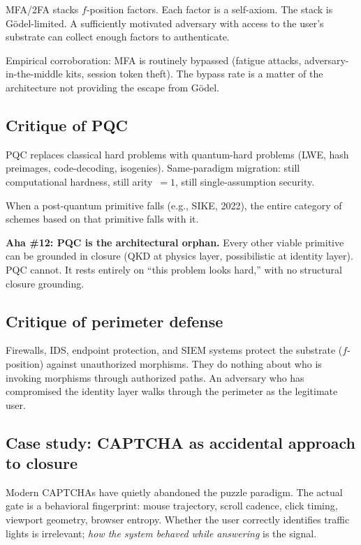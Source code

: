 \documentclass[11pt,a4paper]{article}
\theoremstyle{definition}
\theoremstyle{remark}
\newcommand{\aha}[2]{\medskip\textbf{Aha \##1: #2}}
\begin{document}
MFA/2FA stacks $f$-position factors. Each factor is a self-axiom. The stack is G\"odel-limited. A sufficiently motivated adversary with access to the user's substrate can collect enough factors to authenticate.

Empirical corroboration: MFA is routinely bypassed (fatigue attacks, adversary-in-the-middle kits, session token theft). The bypass rate is a matter of the architecture not providing the escape from G\"odel.

\subsection{Critique of PQC}

PQC replaces classical hard problems with quantum-hard problems (LWE, hash preimages, code-decoding, isogenies). Same-paradigm migration: still computational hardness, still arity~$= 1$, still single-assumption security.

When a post-quantum primitive falls (e.g., SIKE, 2022), the entire category of schemes based on that primitive falls with it.

\aha{12}{PQC is the architectural orphan.} Every other viable primitive can be grounded in closure (QKD at physics layer, possibilistic at identity layer). PQC cannot. It rests entirely on ``this problem looks hard,'' with no structural closure grounding.

\subsection{Critique of perimeter defense}

Firewalls, IDS, endpoint protection, and SIEM systems protect the substrate ($f$-position) against unauthorized morphisms. They do nothing about who is invoking morphisms through authorized paths. An adversary who has compromised the identity layer walks through the perimeter as the legitimate user.

\subsection{Case study: CAPTCHA as accidental approach to closure}

Modern CAPTCHAs have quietly abandoned the puzzle paradigm. The actual gate is a behavioral fingerprint: mouse trajectory, scroll cadence, click timing, viewport geometry, browser entropy. Whether the user correctly identifies traffic lights is irrelevant; \emph{how the system behaved while answering} is the signal.
\end{document}
